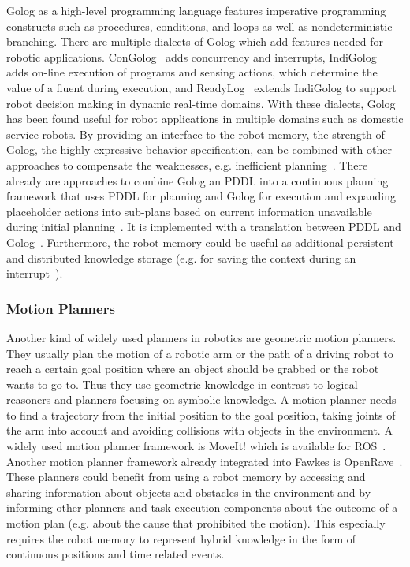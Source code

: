\documentclass[a4paper,11pt]{article}
\begin{document}
Golog as a high-level programming language features imperative
programming constructs such as procedures, conditions, and loops as
well as nondeterministic branching. There are multiple dialects of
Golog which add features needed for robotic
applications. ConGolog~\cite{ConGolog} adds concurrency and
interrupts, IndiGolog~\cite{IndiGolog} adds on-line execution of
programs and sensing actions, which determine the value of a fluent
during execution, and ReadyLog~\cite{ferrein08ras} extends IndiGolog
to support robot decision making in dynamic real-time domains. With these
dialects, Golog has been found useful for robot applications in
multiple domains such as domestic service robots. By providing an
interface to the robot memory, the strength of Golog, the highly
expressive behavior specification, can be combined with other
approaches to compensate the weaknesses, e.g. inefficient
planning~\cite{Golog-Planning}. There already are approaches to
combine Golog an PDDL into a continuous planning framework that uses
PDDL for planning and Golog for execution and expanding placeholder
actions into sub-plans based on current information unavailable during
initial planning~\cite{ContPlanGolog}. It is implemented with a
translation between PDDL and
Golog~\cite{Golog-PDDL-Trans}. Furthermore, the robot memory could be
useful as additional persistent and distributed knowledge storage
(e.g. for saving the context during an interrupt~\cite{Gesche-Thesis}).

\subsubsection{Motion Planners}
Another kind of widely used planners in robotics are geometric motion
planners. They usually plan the motion of a robotic arm or the path
of a driving robot to reach a certain goal position where an object
should be grabbed or the robot wants to go to. Thus they use geometric
knowledge in contrast to logical reasoners and planners focusing on
symbolic knowledge.
A motion planner needs to find a trajectory from the initial position to
the goal position, taking joints of the arm into account and avoiding
collisions with objects in the environment. A widely used motion
planner framework is MoveIt! which is available for ROS~\cite{MoveIt}.
Another motion planner framework already integrated into
Fawkes is OpenRave~\cite{OpenRave}. These planners could benefit from
using a robot memory by accessing and sharing information about
objects and obstacles in the environment and by informing other
planners and task execution components about the outcome of a motion
plan (e.g. about the cause that prohibited the motion). This
especially requires the robot memory to represent hybrid knowledge in
the form of continuous positions and time related events.
\end{document}
